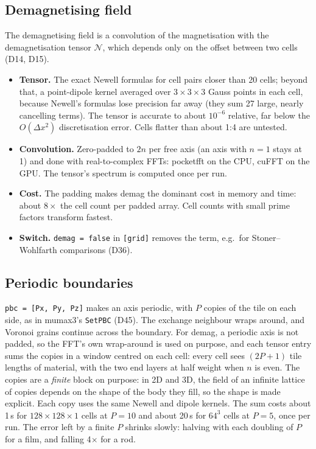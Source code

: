 \documentclass[10pt,a4paper]{article}
\newcommand{\code}[1]{\texttt{#1}}
\newcommand{\dec}[1]{\textcolor{comment}{\small(#1)}}
\begin{document}
\subsection{Demagnetising field}
The demagnetising field is a convolution of the magnetisation with the demagnetisation tensor $\mathcal{N}$, which
depends only on the offset between two cells \dec{D14, D15}.
\begin{itemize}
  \item \textbf{Tensor.} The exact Newell formulas for cell pairs closer than 20 cells; beyond that, a point-dipole kernel
        averaged over $3\times3\times3$ Gauss points in each cell, because Newell's formulas lose precision far away
        (they sum 27 large, nearly cancelling terms). The tensor is accurate to about $10^{-6}$ relative, far below the
        $O(\Delta x^2)$ discretisation error. Cells flatter than about 1:4 are untested.
  \item \textbf{Convolution.} Zero-padded to $2n$ per free axis (an axis with $n=1$ stays at 1) and done with real-to-complex
        FFTs: pocketfft on the CPU, cuFFT on the GPU. The tensor's spectrum is computed once per run.
  \item \textbf{Cost.} The padding makes demag the dominant cost in memory and time: about $8\times$ the cell count per
        padded array. Cell counts with small prime factors transform fastest.
  \item \textbf{Switch.} \code{demag = false} in \code{[grid]} removes the term, e.g.\ for Stoner--Wohlfarth comparisons
        \dec{D36}.
\end{itemize}

\subsection{Periodic boundaries}
\code{pbc = [Px, Py, Pz]} makes an axis periodic, with $P$ copies of the tile on each side, as in mumax3's
\code{SetPBC} \dec{D45}. The exchange neighbour wraps around, and Voronoi grains continue across the boundary.
For demag, a periodic axis is not padded, so the FFT's own wrap-around is used on purpose, and each tensor entry sums
the copies in a window centred on each cell: every cell sees $(2P+1)$ tile lengths of material, with the two end
layers at half weight when $n$ is even. The copies are a \emph{finite} block on purpose: in 2D and 3D, the field of an
infinite lattice of copies depends on the shape of the body they fill, so the shape is made explicit. Each copy uses
the same Newell and dipole kernels. The sum costs about 1\,s for $128\times128\times1$ cells at $P=10$ and about 20\,s
for $64^3$ cells at $P=5$, once per run. The error left by a finite $P$ shrinks slowly: halving with each doubling of
$P$ for a film, and falling 4$\times$ for a rod.
\end{document}
